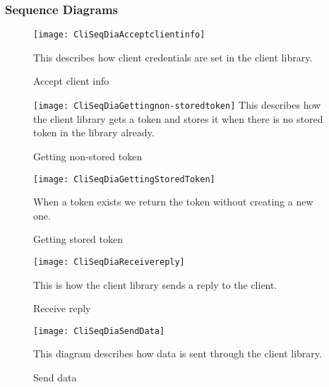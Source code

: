 	\subsubsection{Sequence Diagrams}\label{client sequence diagrams}
		\begin{figure}[H]
			\centering	
			\texttt{[image: CliSeqDiaAcceptclientinfo]}
			\caption{Accept client info}
			This describes how client credentials are set in the client library. 
			\label{fig:CliSeqDiaAcceptclientinfo}
		\end{figure}
		\begin{figure}[H]
			\centering	
			\texttt{[image: CliSeqDiaGettingnon-storedtoken]}
			This describes how the client library gets a token and stores it when there is no stored token in the library already. 
			\caption{Getting non-stored token}
			\label{fig:CliSeqDiaGettingnon-storedtoken}
		\end{figure}
		\begin{figure}[H]
			\centering	
			\texttt{[image: CliSeqDiaGettingStoredToken]}
			\caption{Getting stored token}
			When a token exists we return the token without creating a new one. 
			\label{fig:CliSeqDiaGettingStoredToken}
		\end{figure}
		\begin{figure}[H]
			\centering	
			\texttt{[image: CliSeqDiaReceivereply]}
			\caption{Receive reply}
			This is how the client library sends a reply to the client. 
			\label{fig:CliSeqDiaReceivereply}
		\end{figure}
		\begin{figure}[H]
			\centering	
			\texttt{[image: CliSeqDiaSendData]}
			\caption{Send data}
			This diagram describes how data is sent through the client library. 
			\label{fig:CliSeqDiaSendData}
		\end{figure}

		

